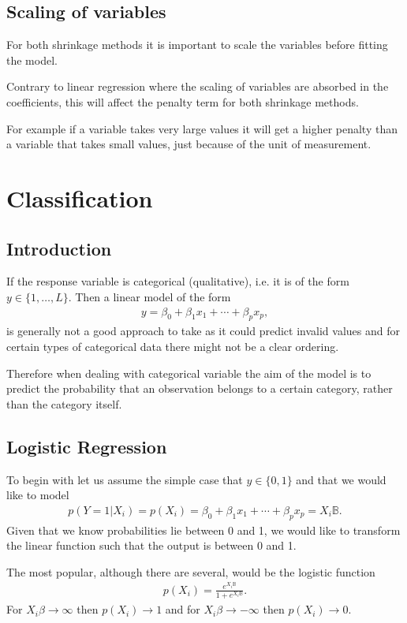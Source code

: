 \documentclass[aspectratio=169,10pt]{beamer}
\begin{document}
\subsection{Scaling of variables}
\begin{frame}{\secname}{\subsecname}
  For both shrinkage methods it is important to scale the variables before fitting the model.

  Contrary to linear regression where the scaling of variables are absorbed in the coefficients, this will affect the penalty term for both shrinkage methods.

  For example if a variable takes very large values it will get a higher penalty than a variable that takes small values, just because of the unit of measurement.
\end{frame}

\section{Classification}

\subsection{Introduction}
\begin{frame}{\secname}{\subsecname}
  If the response variable is categorical (qualitative), i.e.\! it is of the form $y\in\{1,\ldots,L\}$. Then a linear model of the form
  \begin{align*}
    y = \beta_0 + \beta_1 x_1 + \cdots + \beta_px_p,
  \end{align*}
  is generally not a good approach to take as it could predict invalid values and for certain types of categorical data there might not be a clear ordering.
  
  Therefore when dealing with categorical variable the aim of the model is to predict the probability that an observation belongs to a certain category, rather than the category itself.
\end{frame}

\subsection{Logistic Regression}
\begin{frame}{\secname}{\subsecname}
  To begin with let us assume the simple case that $y\in \{0,1\}$ and that we would like to model
  \begin{align}
    p(Y = 1 | X_i) = p(X_i) = \beta_0 + \beta_1 x_1 + \cdots + \beta_px_p = X_i \mathbb{B}.
  \end{align}
  Given that we know probabilities lie between 0 and 1, we would like to transform the linear function such that the output is between 0 and 1.

  The most popular, although there are several, would be the logistic function
  \begin{align}
    p(X_i) = \frac{e^{X_i \mathbb{B}}}{1 + e^{X_i \mathbb{B}}}.
  \end{align}
  For $X_i \beta \rightarrow \infty$ then $p(X_i) \rightarrow 1$ and for $X_i \beta \rightarrow - \infty$ then $p(X_i) \rightarrow 0$.
\end{frame}
\end{document}
